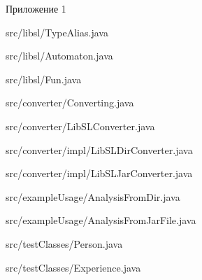
\newpage
\begin{flushright}
Приложение 1
\end{flushright}




{src/libsl/TypeAlias.java}


{src/libsl/Automaton.java}


{src/libsl/Fun.java}


{src/converter/Converting.java}


{src/converter/LibSLConverter.java}


{src/converter/impl/LibSLDirConverter.java}


{src/converter/impl/LibSLJarConverter.java}


{src/exampleUsage/AnalysisFromDir.java}


{src/exampleUsage/AnalysisFromJarFile.java}


{src/testClasses/Person.java}


{src/testClasses/Experience.java}
